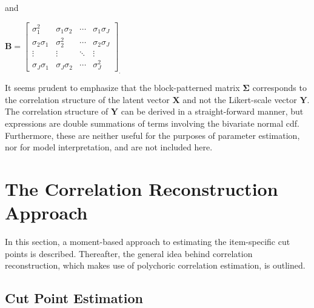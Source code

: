 \documentclass[12pt]{article}
\begin{document}
and

\begin{center}
$\mathbf{B} = \left[ 
\begin{array}{cccc}
\sigma_1^2 & \sigma_1 \sigma_2 & \cdots & \sigma_1 \sigma_J \\ 
\sigma_2 \sigma_1 & \sigma_2^2 & \cdots & \sigma_2 \sigma_J \\ 
\vdots & \vdots & \ddots & \vdots \\ 
\sigma_J \sigma_1 & \sigma_J \sigma_2 & \cdots & \sigma_J^2%
\end{array}
\right]_. $
\end{center}

\bigskip

It seems prudent to emphasize that the block-patterned matrix $\boldsymbol{\Sigma}$ corresponds to the correlation structure of the latent vector $\mathbf{X}$ and not the Likert-scale vector $\mathbf{Y}$. The correlation structure of $\mathbf{Y}$ can be derived in a straight-forward manner, but expressions are double summations of terms involving the bivariate normal cdf. Furthermore, these are neither useful for the purposes of parameter estimation, nor for model interpretation, and are not included here.

\section{The Correlation Reconstruction Approach}

In this section, a moment-based approach to estimating the item-specific cut points is described. Thereafter, the general idea behind correlation reconstruction, which makes use of polychoric correlation estimation, is outlined.

\subsection{Cut Point Estimation}
\end{document}
